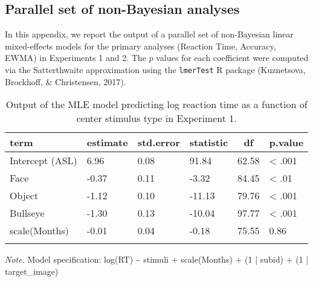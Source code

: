 \documentclass[,man,floatsintext]{apa6}
\begin{document}
\begin{appendix}
\hypertarget{parallel-set-of-non-bayesian-analyses}{%
\section{Parallel set of non-Bayesian
analyses}\label{parallel-set-of-non-bayesian-analyses}}

In this appendix, we report the output of a parallel set of non-Bayesian
linear mixed-effects models for the primary analyses (Reaction Time,
Accuracy, EWMA) in Experiments 1 and 2. The \(p\) values for each
coefficient were computed via the Satterthwaite approximation using the
\texttt{lmerTest} R package (Kuznetsova, Brockhoff, \& Christensen,
2017).

\begin{table}[h]
\begin{center}
\begin{threeparttable}
\caption{\label{tab:mle rt trio}Output of the MLE model predicting log reaction time as a function of center stimulus type in Experiment 1.}
\begin{tabular}{llllll}
\toprule
term & \multicolumn{1}{c}{estimate} & \multicolumn{1}{c}{std.error} & \multicolumn{1}{c}{statistic} & \multicolumn{1}{c}{df} & \multicolumn{1}{c}{p.value}\\
\midrule
Intercept (ASL) & 6.96 & 0.08 & 91.84 & 62.58 & < .001\\
Face & -0.37 & 0.11 & -3.32 & 84.45 & < .01\\
Object & -1.12 & 0.10 & -11.13 & 79.76 & < .001\\
Bullseye & -1.30 & 0.13 & -10.04 & 97.77 & < .001\\
scale(Months) & -0.01 & 0.04 & -0.18 & 75.55 & 0.86\\
\bottomrule
\addlinespace
\end{tabular}
\begin{tablenotes}[para]
\normalsize{\textit{Note.} Model specification: log(RT) \textasciitilde{} stimuli + scale(Months) + (1 | subid) + (1 | target\_image)}
\end{tablenotes}
\end{threeparttable}
\end{center}
\end{table}


\end{appendix}
\end{document}

